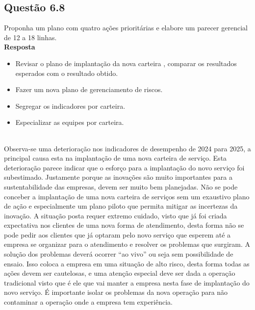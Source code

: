 \subsection{Questão 6.8}
Proponha um plano com quatro ações prioritárias e elabore um parecer gerencial de 12 a 18 linhas.\\
\textbf{Resposta}\\
\begin{itemize}
\item Revisar o plano de implantação da nova carteira , comparar os resultados esperados com o resultado obtido.\\
\item Fazer um nova plano de gerenciamento de riscos.\\
\item Segregar os indicadores por carteira.\\
\item Especializar as equipes por carteira.\\
\end{itemize}\\
Observa-se uma deterioração nos indicadores de desempenho de 2024 para 2025, a principal causa esta na implantação de uma nova carteira de serviço. Esta deterioração parece indicar que o esforço para a implantação do novo serviço foi subestimado. Justamente porque as inovações são muito importantes para a sustentabilidade das empresas, devem ser muito bem planejadas. Não se pode conceber a implantação de uma nova carteira de serviços sem um exaustivo plano de ação e especialmente um plano piloto que permita mitigar as incertezas da inovação. A situação posta requer extremo cuidado, visto que já foi criada expectativa nos clientes de uma nova forma de atendimento, desta forma não se pode pedir aos clientes que já optaram pelo novo serviço que esperem até a empresa se organizar para o atendimento e resolver os problemas que surgiram. A solução dos problemas deverá ocorrer ``ao vivo'' ou seja sem possibilidade de ensaio. Isso coloca a empresa em uma situação de alto risco, desta forma todas as ações devem ser cautelosas, e uma atenção especial deve ser dada a operação tradicional visto que é ele que vai manter a empresa nesta fase de implantação do novo serviço. É importante isolar os problemas da nova operação para não contaminar a operação onde a empresa tem experiência.\\

